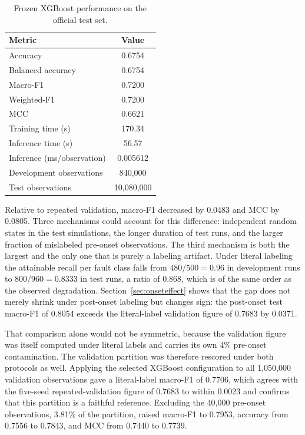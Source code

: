 \documentclass[12pt,a4paper]{article}
\begin{document}
\begin{table}[H]
\centering
\caption{Frozen XGBoost performance on the official test set.}
\label{tab:test}
\small
\begin{tabular}{lc}
\toprule
Metric & Value\\
\midrule
Accuracy & 0.6754\\
Balanced accuracy & 0.6754\\
Macro-F1 & 0.7200\\
Weighted-F1 & 0.7200\\
MCC & 0.6621\\
Training time (s) & 170.34\\
Inference time (s) & 56.57\\
Inference (ms/observation) & 0.005612\\
Development observations & 840,000\\
Test observations & 10,080,000\\
\bottomrule
\end{tabular}
\end{table}

Relative to repeated validation, macro-F1 decreased by 0.0483 and MCC by
0.0805. Three mechanisms could account for this difference: independent random
states in the test simulations, the longer duration of test runs, and the
larger fraction of mislabeled pre-onset observations. The third mechanism is
both the largest and the only one that is purely a labeling artifact. Under
literal labeling the attainable recall per fault class falls from $480/500=0.96$
in development runs to $800/960=0.8333$ in test runs, a ratio of 0.868, which
is of the same order as the observed degradation. Section~\ref{sec:onseteffect}
shows that the gap does not merely shrink under post-onset labeling but changes
sign: the post-onset test macro-F1 of 0.8054 exceeds the literal-label
validation figure of 0.7683 by 0.0371.

That comparison alone would not be symmetric, because the validation figure
was itself computed under literal labels and carries its own 4\% pre-onset
contamination. The validation partition was therefore rescored under both
protocols as well. Applying the selected XGBoost configuration to all
1,050,000 validation observations gave a literal-label macro-F1 of 0.7706,
which agrees with the five-seed repeated-validation figure of 0.7683 to within
0.0023 and confirms that this partition is a faithful reference. Excluding the
40,000 pre-onset observations, 3.81\% of the partition, raised macro-F1 to
0.7953, accuracy from 0.7556 to 0.7843, and MCC from 0.7440 to 0.7739.
\end{document}
